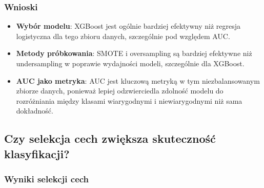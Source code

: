\documentclass{article}
\begin{document}
\subsubsection{Wnioski}
\begin{itemize}
    \item \textbf{Wybór modelu}: XGBoost jest ogólnie bardziej efektywny niż regresja logistyczna dla tego zbioru danych, szczególnie pod względem AUC.
    \item \textbf{Metody próbkowania}: SMOTE i oversampling są bardziej efektywne niż undersampling w poprawie wydajności modeli, szczególnie dla XGBoost.
    \item \textbf{AUC jako metryka}: AUC jest kluczową metryką w tym niezbalansowanym zbiorze danych, ponieważ lepiej odzwierciedla zdolność modelu do rozróżniania między klasami wiarygodnymi i niewiarygodnymi niż sama dokładność.
\end{itemize}

\subsection{Czy selekcja cech zwiększa skuteczność klasyfikacji?}

\subsubsection{Wyniki selekcji cech}
\end{document}
